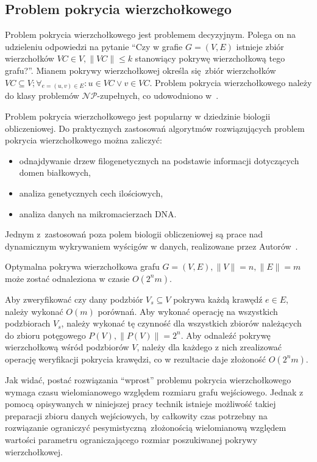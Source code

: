 \subsection{Problem pokrycia wierzchołkowego}\label{s_vertex_cover_domain}
\par{
  Problem pokrycia wierzchołkowego jest problemem decyzyjnym.
  Polega on na udzieleniu odpowiedzi na pytanie ``Czy w grafie $G=(V,E)$
  istnieje zbiór wierzchołków $VC \in V, \|VC\| \leq k$ stanowiący pokrywę 
  wierzchołkową tego grafu?''.
  Mianem pokrywy wierzchołkowej określa się zbiór wierzchołków $VC
  \subseteq V; \forall_{e=(u,v) \in E}:u\in VC\lor v\in VC$.
  Problem pokrycia wierzchołkowego należy do klasy problemów 
  $\mathcal{NP}$-zupełnych, co udowodniono w~\cite{Kar72}.
}
\par{
  Problem pokrycia wierzchołkowego jest popularny w dziedzinie biologii
  obliczeniowej. 
  Do praktycznych zastosowań algorytmów rozwiązujących problem pokrycia
  wierzchołkowego można zaliczyć:
  \begin{itemize}
    \item odnajdywanie drzew filogenetycznych na podstawie informacji
      dotyczących domen białkowych,
    \item analiza genetycznych cech ilościowych,
    \item analiza danych na mikromacierzach DNA.\@
  \end{itemize}

  Jednym z~zastosowań poza polem biologii obliczeniowej są prace nad dynamicznym
  wykrywaniem wyścigów w danych, realizowane przez 
  Autorów~\cite{O'Callahan:2003:HDD:781498.781528}.
}
\begin{theorem}
  Optymalna pokrywa wierzchołkowa grafu $G=(V,E), \|V\|=n, \|E\|=m$ może zostać 
  odnaleziona w czasie $O(2^{n}m)$.
\end{theorem}
\begin{bproof}
  Aby zweryfikować czy dany podzbiór $V_s \subseteq V$ pokrywa każdą krawędź
  $e \in E$, należy wykonać $O(m)$ porównań.
  Aby wykonać operację na wszystkich podzbiorach $V_s$, należy wykonać tę
  czynność dla wszystkich zbiorów należących do zbioru potęgowego 
  $P(V), \|P(V)\| = 2^{n}$.
  Aby odnaleźć pokrywę wierzchołkową wśród podzbiorów $V$, należy dla każdego z
  nich zrealizować operację weryfikacji pokrycia krawędzi, co w rezultacie daje 
  złożoność $O(2^{n}m)$.
\end{bproof}
\par{
  Jak widać, postać rozwiązania ``wprost'' problemu pokrycia wierzchołkowego
  wymaga czasu wielomianowego względem rozmiaru grafu wejściowego.
  Jednak z pomocą opisywanych w niniejszej pracy technik istnieje możliwość
  takiej preparacji zbioru danych wejściowych, by całkowity czas potrzebny na
  rozwiązanie ograniczyć pesymistyczną~złożonością wielomianową względem
  wartości parametru ograniczającego rozmiar poszukiwanej pokrywy
  wierzchołkowej.
}
